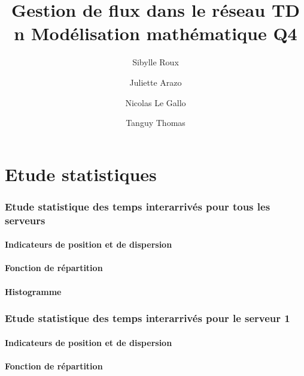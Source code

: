 \documentclass{article}
\begin{document}
\title{Gestion de flux dans le réseau
	\smallbreak
	TD n
	\smallbreak
	Modélisation mathématique
	\smallbreak
	Q4}
\author{Sibylle Roux \and Juliette Arazo \and Nicolas Le Gallo \and Tanguy Thomas}


\maketitle

\newpage

\tableofcontents

\newpage

\part{Etude statistiques}

\section{Etude statistique des temps interarrivés pour tous les serveurs}

\subsection{Indicateurs de position et de dispersion}

\subsection{Fonction de répartition}

\subsection{Histogramme}


\section{Etude statistique des temps interarrivés pour le serveur 1}

\subsection{Indicateurs de position et de dispersion}

\subsection{Fonction de répartition}
\end{document}
